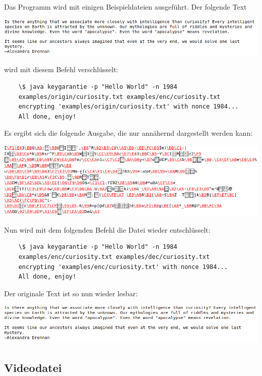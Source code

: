 \documentclass[10pt,a4paper]{article}
\begin{document}
Das Programm wird mit einigen Beispieldateien ausgeführt.
Der folgende Text
\begin{center}
    \includegraphics[width=1.0\textwidth]{curiosity_orig.png}
\end{center}
wird mit diesem Befehl verschlüsselt:
\begin{verbatim}
    \$ java keygarantie -p "Hello World" -n 1984
    examples/origin/curiosity.txt examples/enc/curiosity.txt
    encrypting 'examples/origin/curiosity.txt' with nonce 1984...
    All done, enjoy!
\end{verbatim}
Es ergibt sich die folgende Ausgabe, die nur annähernd dargestellt werden kann:
\begin{center}
    \includegraphics[width=1.0\textwidth]{curiosity_enc.png}
\end{center}

Nun wird mit dem folgenden Befehl die Datei wieder entschlüsselt:
\begin{verbatim}
    \$ java keygarantie -p "Hello World" -n 1984
    examples/enc/curiosity.txt examples/dec/curiosity.txt
    encrypting 'examples/enc/curiosity.txt' with nonce 1984...
    All done, enjoy!
\end{verbatim}
Der originale Text ist so nun wieder lesbar:
\begin{center}
    \includegraphics[width=1.0\textwidth]{curiosity_dec.png}
\end{center}

\subsection{Videodatei}
\end{document}
